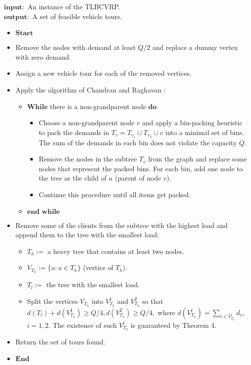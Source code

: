 \begin{algorithm}
\caption {} 
$\mathbf{input:}$ An instance of the TLBCVRP.\\
$\mathbf{output:}$ A set of feasible vehicle tours. 
\begin{itemize}
\item[] $\mathbf{Start}$
\item[] Remove the nodes with demand at least $Q/2$ and replace a dummy vertex with zero demand.
\item[] Assign a new vehicle tour for each of the removed vertices. 
\item[] Apply the algorithm of Chandran and Raghavan \cite{Chandran}:
\begin{itemize}
\item[] $\mathbf{While}$ there is a non-grandparent node $\mathbf{do}$
\begin{itemize}
\item[] Choose a non-grandparent node $v$ and apply a bin-packing heuristic to pack the demands in $T_v=T_{v_1}\cup T_{v_2} \cup v$ into a minimal set of bins. The sum of the demands in each bin does not violate the capacity $Q$. 
\item[] Remove the nodes in the subtree $T_v$ from the graph and replace some nodes that represent the packed bins. For each bin, add one node to the tree as the child of $u$ (parent of node $v$).  
\item[] Continue this procedure until all items get packed. 
\end{itemize}
\item[] $\mathbf{end\,\,while}$
\end{itemize}
\item[] Remove some of the clients from the subtree with the highest load and append them to the tree with the smallest load:
\begin{itemize}
\item[] $T_h:=$ a heavy tree that contains at least two nodes.
\item[] $V_{T_h}:=\{u: u\in T_h\}$ (vertice of $T_h$).
\item[] $T_l:=$ the tree with the smallest load. 
\item[] Split the vertices $V_{T_h}$ into $V^1_{T_h}$ and $V^2_{T_h}$ so that $d(T_l)+d(V^1_{T_h})\ge Q/4, d(V^2_{T_h})\ge Q/4,$
\noindent where $d(V^i_{T_h})=\sum_{v \in V^i_{T_h}} d_v $, $i=1,2$. The existence of such $V^i_{T_h}$  is guaranteed by Theorem 4. 
\end{itemize}
\item[] Return the set of tours found.
\item[] $\mathbf{End}$
\end{itemize}
\end{algorithm}

